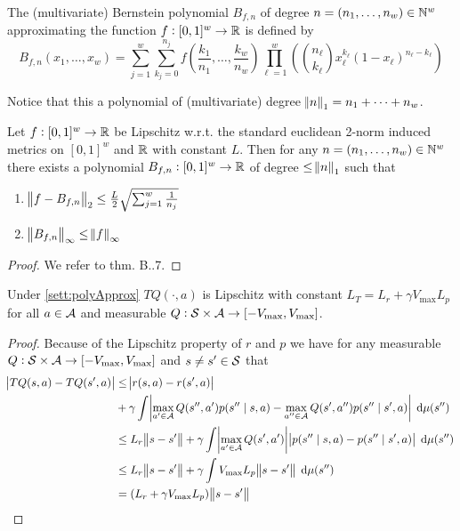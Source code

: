 \begin{defn}
  The (multivariate) Bernstein polynomial $B_{f, n}$ of degree
  $n=(n_1, \dots, n_w) \in \mathbb{N}^w$ approximating the function $f:[0,1]^w \to \mathbb{R}$
  is defined by
  \begin{equation*}
    B_{f, n}(x_1, \dots, x_w) =
    \sum_{j = 1}^w \sum_{k_j = 0}^{n_j}
    f\left( \frac{k_1}{n_1}, \dots, \frac{k_w}{n_w} \right)
    \prod_{\ell = 1}^w \left(
    \binom{n_\ell}{k_\ell} x_\ell^{k_\ell}(1-x_\ell)^{n_\ell - k_\ell} \right)
  \end{equation*}
  \label{defn:Bfn}
\end{defn}
Notice that this a polynomial of (multivariate) degree
$\norm{n}_1 = n_1 + \dots + n_w$.

\begin{thm}
  Let $f : [0,1]^w \to \mathbb{R}$ be Lipschitz
  w.r.t. the standard euclidean 2-norm induced metrics on $[0,1]^w$ and $\mathbb{R}$
  with constant $L$. 
  Then for any $n = (n_1, \dots, n_w) \in \mathbb{N}^w$ there exists a polynomial
  $B_{f,n} : [0,1]^w \to \mathbb{R}$ of degree $\leq \norm{n}_1$ such that
  \begin{enumerate}
    \item $\norm{f - B_{f,n}}_2
      \leq \frac{L}{2} \sqrt{\sum_{j=1}^w \frac{1}{n_j}}$
    \item $\norm{B_{f,n}}_\infty \leq \norm{f}_\infty$
  \end{enumerate}
  \label{thm:bernsteinApprox}
\end{thm}
\begin{proof}
  We refer to  thm. B..7.
\end{proof}

\begin{lem}
  Under \cref{sett:polyApprox} 
  $TQ(\cdot, a)$ is Lipschitz with constant
  $ L_T = L_r + \gamma V_{\max} L_p $
  for all $a \in \mathcal{A}$ and measurable
  $Q : \mathcal{S} \times \mathcal{A} \to [-V_{\max},V_{\max}]$.
  \label{lem:bernsteinLem}
\end{lem}
\begin{proof}
  Because of the Lipschitz property of $r$ and $p$ we have
  for any measurable $Q : \mathcal{S} \times \mathcal{A} \to [-V_{\max},V_{\max}]$
  and $s \neq s' \in \mathcal{S}$ that
  \begin{align*}
    \abs{TQ(s, a) - TQ(s', a)}
    &\leq \abs{r(s, a) - r(s', a)} 
    \\ &+ \gamma \int
    \abs{\max_{a'\in\mathcal{A}}Q(s'', a') p(s'' \mid s, a)
    - \max_{a'' \in \mathcal{A}} Q(s', a'') p(s'' \mid s', a) }
    \; \mathrm{d} \mu(s'')
    \\ &\leq L_r \norm{s - s'} + \gamma \int
    \abs{\max_{a'\in\mathcal{A}}Q(s', a')}
    \abs{p(s'' \mid s, a) - p(s'' \mid s', a)}
    \; \mathrm{d} \mu(s'')
    \\ &\leq L_r \norm{s - s'} + \gamma \int
    V_{\max}
    L_p \norm{s - s'}
    \; \mathrm{d} \mu(s'')
    \\ & = (L_r + \gamma V_{\max} L_p) \norm{s - s'}
  \end{align*}
\end{proof}

